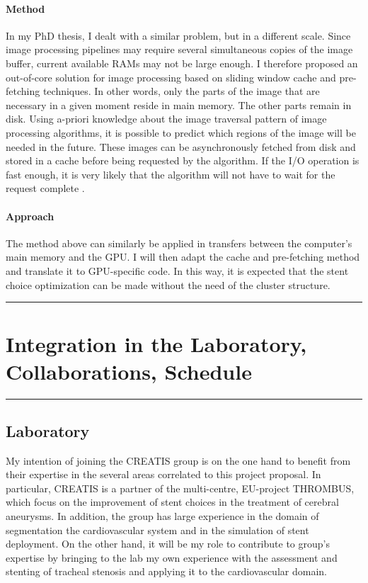 \documentclass[a4paper]{article}
\newcommand{\method}{\paragraph{Method}}
\newcommand{\approach}{\paragraph{Approach}}
\begin{document}
\method
In my PhD thesis, I dealt with a similar problem, but in a different scale. Since image processing pipelines may require several simultaneous copies of the image buffer, current available RAMs may not be large enough. I therefore proposed an out-of-core solution for image processing based on sliding window cache and pre-fetching techniques. In other words, only the parts of the image that are necessary in a given moment reside in main memory. The other parts remain in disk. Using a-priori knowledge about the image traversal pattern of image processing algorithms, it is possible to predict which regions of the image will be needed in the future. These images can be asynchronously fetched from disk and stored in a cache before being requested by the algorithm. If the I/O operation is fast enough, it is very likely that the algorithm will not have to wait for the request complete \citep{Pinho:Cache1}. 

\approach
The method above can similarly be applied in transfers between the computer's main memory and the GPU. I will then adapt the cache and pre-fetching method and translate it to GPU-specific code. In this way, it is expected that the stent choice optimization can be made without the need of the cluster structure.

\medskip
\medskip
\pagebreak
\hrule
\section{Integration in the Laboratory, Collaborations, Schedule}
\hrule

\medskip
\medskip

\subsection{Laboratory}

My intention of joining the CREATIS group is on the one hand to benefit from their expertise in the several areas correlated to this project proposal. In particular, CREATIS is a partner of the multi-centre, EU-project THROMBUS, which focus on the improvement of stent choices in the treatment of cerebral aneurysms. In addition, the group has large experience in the domain of segmentation the cardiovascular system and in the simulation of stent deployment. On the other hand, it will be my role to contribute to group's expertise by bringing to the lab my own experience with the assessment and stenting of tracheal stenosis and applying it to the cardiovascular domain.
\end{document}
